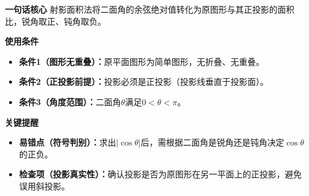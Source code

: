 \begin{summarybox}
	\textbf{\textcolor{CSummary}{一句话核心}}
	射影面积法将二面角的余弦绝对值转化为原图形与其正投影的面积比，锐角取正、钝角取负。

	\medskip
	\textbf{\textcolor{CSummary}{使用条件}}
	\begin{itemize}[leftmargin=*,itemsep=0.5em,topsep=0.4em]
		\item\textbf{条件1（图形无重叠）：}原平面图形为简单图形，无折叠、无重叠。\item\textbf{条件2（正投影前提）：}投影必须是正投影（投影线垂直于投影面）。\item\textbf{条件3（角度范围）：}二面角$\theta$满足$0<\theta<\pi$。
	\end{itemize}

	\medskip
	\textbf{\textcolor{CSummary}{关键提醒}}
	\begin{itemize}[leftmargin=*,itemsep=0.5em,topsep=0.4em]
		\item\textbf{易错点（符号判别）：}求出$|\cos\theta|$后，需根据二面角是锐角还是钝角决定$\cos\theta$的正负。\item\textbf{检查项（投影真实性）：}确认投影是否为原图形在另一平面上的正投影，避免误用斜投影。
	\end{itemize}

\end{summarybox}
